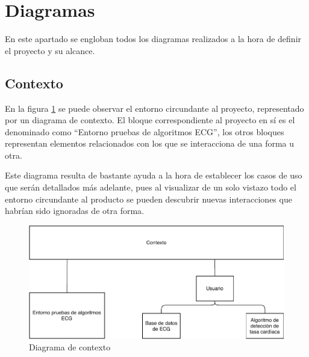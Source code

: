 \minitoc
\clearpage

\section{Diagramas}

En este apartado se engloban todos los diagramas realizados a la hora de definir el proyecto y su alcance.

    \subsection{Contexto}
     
    En la figura \ref{fig:CtxDiagram} se puede observar el entorno circundante al proyecto, representado por un diagrama de contexto. El bloque correspondiente al proyecto en sí es el denominado como ``Entorno pruebas de algoritmos ECG'', los otros bloques representan elementos relacionados con los que se interacciona de una forma u otra. 

    Este diagrama resulta de bastante ayuda a la hora de establecer los casos de uso que serán detallados más adelante, pues al visualizar de un solo vistazo todo el entorno circundante al producto se pueden descubrir nuevas interacciones que habrían sido ignoradas de otra forma.        

    \begin{figure}[H]  
        \centering
            \includegraphics[width =\linewidth]{figuras/ContextDiagram.pdf}
        \caption{Diagrama de contexto}
        \label{fig:CtxDiagram}
    \end{figure}

